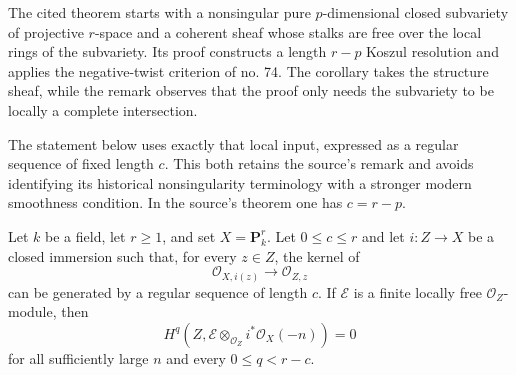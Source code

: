 \begin{lemma}
\label{lemma-negative-twists-complete-intersection}
\begin{reference}
\cite[Chapter III, \S 5, no. 75, Theorem 3, Corollary, and Remark,
pp. 269--270]{FAC}
\end{reference}
\begin{history}
The cited theorem starts with a nonsingular pure $p$-dimensional closed
subvariety of projective $r$-space and a coherent sheaf whose stalks are
free over the local rings of the subvariety. Its proof constructs a
length $r-p$ Koszul resolution and applies the negative-twist criterion of
no. 74. The corollary takes the structure sheaf, while the remark observes
that the proof only needs the subvariety to be locally a complete
intersection.

The statement below uses exactly that local input, expressed as a regular
sequence of fixed length $c$. This both retains the source's remark and
avoids identifying its historical nonsingularity terminology with a
stronger modern smoothness condition. In the source's theorem one has
$c=r-p$.
\end{history}
Let $k$ be a field, let $r\geq1$, and set $X=\mathbf{P}^r_k$.
Let $0\leq c\leq r$ and let $i:Z\to X$ be a closed immersion such that,
for every $z\in Z$, the kernel of
$$
\mathcal{O}_{X,i(z)}\longrightarrow\mathcal{O}_{Z,z}
$$
can be generated by a regular sequence of length $c$.
If $\mathcal{E}$ is a finite locally free $\mathcal{O}_Z$-module, then
$$
H^q\left(Z,\mathcal{E}\otimes_{\mathcal{O}_Z}
i^*\mathcal{O}_X(-n)\right)=0
$$
for all sufficiently large $n$ and every $0\leq q<r-c$.
\end{lemma}

